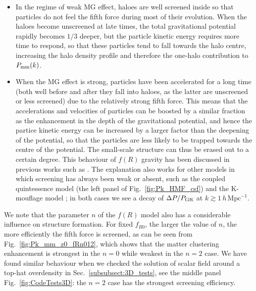 \begin{itemize}
    \item In the regime of weak \ac{MG} effect, haloes are well screened inside so that particles do not feel the fifth force during most of their evolution. 
    When the haloes become unscreened at late times, the total gravitational potential rapidly becomes $1/3$ deeper, but the particle kinetic energy requires more time to respond, so that these particles tend to fall towards the halo centre, increasing the halo density profile and therefore the one-halo contribution to $P_{\rm mm}(k)$.
    \item When the \ac{MG} effect is strong, particles have been accelerated for a long time (both well before and after they fall into haloes, as the latter are unscreened or less screened) due to the relatively strong fifth force. This means that the accelerations and velocities of particles can be boosted by a similar fraction as the enhancement in the depth of the gravitational potential, and hence the partice kinetic energy can be increased by a larger factor than the deepening of the potential, so that the particles are less likely to be trapped towards the centre of the potential. The small-scale structure can thus be erased out to a certain degree.
    This behaviour of $f(R)$ gravity has been discussed in previous works such as \citep[][]{2011PhRvD..83d4007Z,Li:2013MNRAS.428..743L,Mitchell:2019qke}.
    The explanation also works for other models in which screening has always been weak or absent, such as the coupled quintessence model (the left panel of Fig.~\ref{fig:Pk_HMF_csf}) and the K-mouflage model \citep{Hernandez-Aguayo:2021_twin_paper}; in both cases we see a decay of $\Delta P/P_{\rm GR}$ at $k\gtrsim 1 \, h \, \mathrm{Mpc}^{-1}$. 
\end{itemize}

We note that the parameter $n$ of the $f(R)$ model also has a considerable influence on structure formation. For fixed $f_{R0}$, the larger the value of $n$, the more efficiently the fifth force is screened, as can be seen from Fig.~\ref{fig:Pk_mm_z0_fRn012}, which shows that the matter clustering enhancement is strongest in the $n=0$ while weakest in the $n=2$ case. We have found similar behaviour when we checked the solution of scalar field around a top-hat overdensity in Sec.~\ref{subsubsect:3D_tests}, see the middle panel Fig.~\ref{fig:CodeTests3D}: the $n=2$ case has the strongest screening efficiency.



